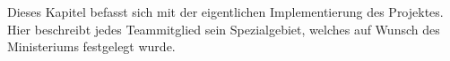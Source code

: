 
Dieses Kapitel befasst sich mit der eigentlichen Implementierung des Projektes. Hier beschreibt jedes Teammitglied sein Spezialgebiet, welches auf Wunsch des Ministeriums festgelegt wurde.